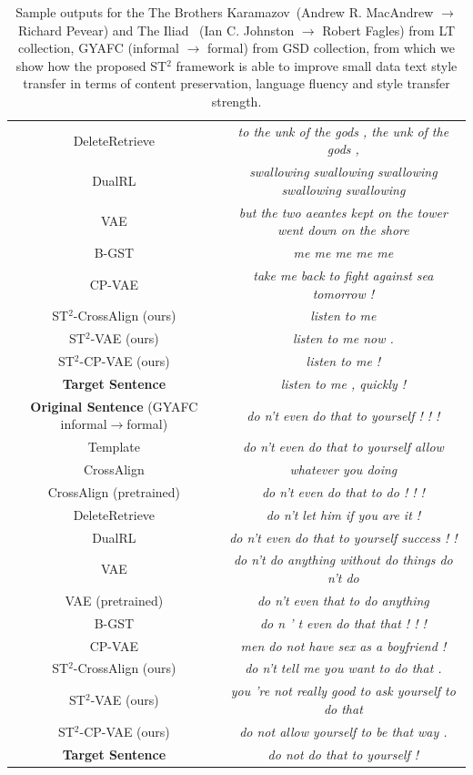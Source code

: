 \begin{table}[t!]
\begin{tabular}{c|c}
		DeleteRetrieve & \emph{to the unk of the gods , the unk of the gods ,} \\
		DualRL & \emph{swallowing swallowing swallowing swallowing swallowing} \\
		VAE & \emph{but the two aeantes kept on the tower went down on the shore} \\
		B-GST & \emph{me me me me me} \\
		CP-VAE & \emph{take me back to fight against sea tomorrow !} \\
		\hline
		ST$^2$-CrossAlign (ours) & \emph{listen to me} \\
		ST$^2$-VAE (ours) & \emph{listen to me now .} \\
		ST$^2$-CP-VAE (ours) & \emph{listen to me !} \\
		\hline
		\textbf{Target Sentence} & \emph{listen to me , quickly !} \\
		\hline
		\hline
		\textbf{Original Sentence} (GYAFC {\color{red}informal}$\rightarrow${\color{blue}formal}) & \emph{do n't even do that to yourself ! ! !} \\
		\hline
		Template & \emph{do n't even do that to yourself allow} \\
		CrossAlign & \emph{whatever you doing} \\
		CrossAlign (pretrained) & \emph{do n't even do that to do ! ! !} \\
		DeleteRetrieve & \emph{do n't let him if you are it !} \\
		DualRL & \emph{do n't even do that to yourself success ! !} \\
		VAE & \emph{do n't do anything without do things do n't do} \\
		VAE (pretrained) & \emph{do n't even that to do anything} \\
		B-GST & \emph{do n ' t even do that that ! ! !} \\
		CP-VAE & \emph{men do not have sex as a boyfriend ! } \\
		\hline
		ST$^2$-CrossAlign (ours) & \emph{do n't tell me you want to do that .} \\
		ST$^2$-VAE (ours) & \emph{you 're not really good to ask yourself to do that} \\
		ST$^2$-CP-VAE (ours) & \emph{do not allow yourself to be that way .} \\
		\hline
		\textbf{Target Sentence} & \emph{do not do that to yourself !} \\
		\hline
	\end{tabular}
	\caption{Sample outputs for the The Brothers Karamazov~({\color{red}Andrew R. MacAndrew}  $\rightarrow$ {\color{blue}Richard Pevear}) and The Iliad ~({\color{red}Ian C. Johnston} $\rightarrow$ {\color{blue}Robert Fagles}) from LT collection, GYAFC ({\color{red}informal} $\rightarrow$ {\color{blue}formal}) from GSD collection, from which we show how the proposed ST$^2$ framework is able to improve small data text style transfer in terms of content preservation, language fluency and style transfer strength.}\label{tb:qual}
\end{table}
